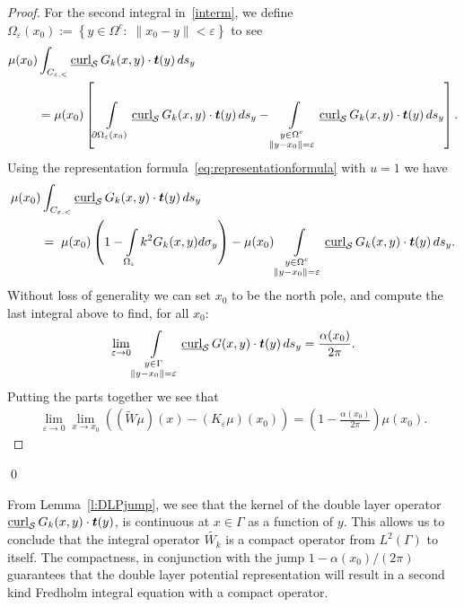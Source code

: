 \begin{proof}
For the second integral in~\eqref{interm}, we define
$\Omega_{\varepsilon}(x_{0}):=\left\{ y\in\Omega^{c}:\; \|x_0-y\|<
\varepsilon \right\}$ to see
\begin{align*}
  \mu(x_0)&\int_{C_{\e,<}} \underline{\mbox{curl}}_{\S}\,
    G_k(x,y)\cdot\vec{t}(y)\,ds_{y} \\
  &= \mu(x_0) \left[ \int\limits_{\partial \Omega_{\varepsilon}(x_0)} 
  \underline{\mbox{curl}}_{\S}\,G_k(x,y)\cdot\vec{t}(y)\,ds_{y} - 
  \int\limits_{\substack{y \in \Omega^{c} \\ \|y - x_{0}\| =
  \varepsilon}}
\underline{\mbox{curl}}_{\S}\,G_k(x,y)\cdot\vec{t}(y)\,ds_{y} \right].
\end{align*}
Using the representation formula~\eqref{eq:representationformula} with
$u=1$ we have
\begin{align*}
  \mu(x_0)&\int_{C_{\e,<}} \underline{\mbox{curl}}_{\S}\,
    G_k(x,y)\cdot\vec{t}(y)\,ds_{y} \\
    &=\;\mu(x_0) \left(1 - \int\limits_{\Omega_{\varepsilon}} 
    k^2 G_k(x,y) d\sigma_{y}\right) 
   - \mu(x_0) \int\limits_{\substack{y \in \Omega^{c} \\ \|y - x_{0}\| =
  \varepsilon}}
\underline{\mbox{curl}}_{\S}\,G_k(x,y)\cdot\vec{t}(y)\,ds_{y}.
\end{align*}
Without loss of generality we can set $x_0$ to be the north pole, and
compute the last integral above  to find, for all $x_{0}$: 
\begin{align*}
  \lim_{\varepsilon\rightarrow 0}
  \int\limits_{\substack{y \in \Gamma \\ \|y - x_{0}\| = \varepsilon}}
  \underline{\mbox{curl}}_{\S}\,G(x,y)\cdot\vec{t}(y)\,ds_{y}
  =\frac{\alpha(x_0)}{2\pi}.
\end{align*}
Putting the parts together we see that
\begin{align*}
  \lim_{\varepsilon\rightarrow 0} \lim_{x\rightarrow x_0}
  \left((\widetilde{W}\mu)(x)-(K_{\varepsilon}\mu)(x_0)\right)
  =\left(1-\frac{\alpha(x_0)}{2\pi}\right)\mu(x_0).
\end{align*}
\end{proof}
\qed

From Lemma~\ref{l:DLPjump}, we see that the kernel of the double layer
operator $\underline{\mbox{curl}}_{\S}\, G_{k}(x,y)\cdot\vec{t}(y)$, is
continuous at $x \in \Gamma$ as a function of $y$.  This allows us to
conclude that the integral operator $\widetilde{W_k}$ is a compact
operator from $L^{2}(\Gamma)$ to itself.  The compactness, in
conjunction with the jump $1-\alpha(x_0)/(2\pi)$
guarantees that the double layer potential representation will result in
a second kind Fredholm integral equation with a compact operator.

